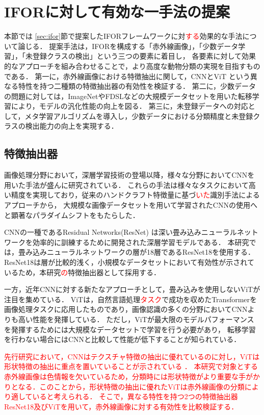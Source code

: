 \documentclass[a4paper,11pt,nomag]{jsreport}
\begin{document}
\section{IFORに対して有効な一手法の提案}

本節では \ref{sec:ifor}節で提案したIFORフレームワークに対\textcolor{red}{する}効果的な手法について論じる．
提案手法は，IFORを構成する「赤外線画像」，「少数データ学習」，「未登録クラスの検出」という三つの要素に着目し，
各要素に対して効果的なアプローチを組み合わせることで，より高度な動物分類の実現を目指すものである．
第一に，赤外線画像における特徴抽出に関して，CNNとViT \cite{vit}という異なる特性を持つ二種類の特徴抽出器の有効性を検証する．
第二に，少数データの問題に対しては，ImageNetやFDSLなどの大規模データセットを用いた転移学習により，モデルの汎化性能の向上を図る．
第三に，未登録データへの対応として，メタ学習アルゴリズムを導入し，少数データにおける分類精度と未登録クラスの検出能力の向上を実現する．

\subsection{特徴抽出器}

画像処理分野において，深層学習技術の登場以降，様々な分野においてCNNを用いた手法が盛んに研究されている．
これらの手法は様々なタスクにおいて高い精度を実現しており，従来のハンドクラフト特徴量に基づ\textcolor{red}{いた}識別手法によるアプローチから，
大規模な画像データセットを用いて学習されたCNNの使用へと顕著なパラダイムシフトをもたらした．

CNNの一種であるResidual Networks(ResNet) \cite{resnet}は深い畳み込みニューラルネットワークを効率的に訓練するために開発された深層学習モデルである．
本研究では，畳み込みニューラルネットワークの層が18層であるResNet18を使用する．
ResNet18は層が比較的浅く，小規模なデータセットにおいて有効性が示されているため，本研究\textcolor{red}{の}特徴抽出器として採用する．

一方，近年CNNに対する新たなアプローチとして，畳み込みを使用しないViTが注目を集めている．
ViTは，自然言語処理\textcolor{red}{タスク}で成功を収めたTransformerを画像処理タスクに応用したものであり，画像認識の多くの分野においてCNNよりも高い性能を発揮している．
ただし，ViTが最大限のモデルパフォーマンスを発揮するためには大規模なデータセットで学習を行う必要があり，
転移学習を行わない場合にはCNNと比較して性能が低下することが知られている\cite{vit}．

\textcolor{red}{
先行研究において，CNNはテクスチャ特徴の抽出に優れているのに対し，ViTは形状特徴の抽出に重点を置いていることが示されている \cite{feature}．
本研究で対象とする赤外線画像は色情報を欠いているため，分類時には形状特徴がより重要な手がかりとなる．このことから，形状特徴の抽出に優れたViTは赤外線画像の分類により適していると考えられる．
そこで，異なる特性を持つ2つの特徴抽出器ResNet18及びViTを用いて，赤外線画像に対する有効性を比較検証する．
}
\end{document}
